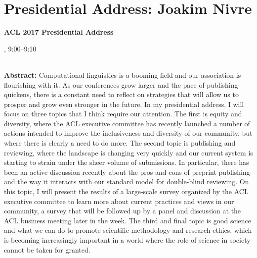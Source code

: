 \section{Presidential Address: Joakim Nivre}

\begin{center}
\begin{Large}
{\bfseries\Large ACL 2017 Presidential Address}\vspace{1em}\par
\end{Large}

\daydateyear, 9:00--9:10 \vspace{1em}\\
\PlenaryLoc \\
\vspace{1em}\par
\end{center}

\noindent
{\bfseries Abstract:} Computational linguistics is a booming field and our association is flourishing with it. As our conferences grow larger and the pace of publishing quickens, there is a constant need to reflect on strategies that will allow us to prosper and grow even stronger in the future. In my presidential address, I will focus on three topics that I think require our attention. The first is equity and diversity, where the ACL executive committee has recently launched a number of actions intended to improve the inclusiveness and diversity of our community, but where there is clearly a need to do more. The second topic is publishing and reviewing, where the landscape is changing very quickly and our current system is starting to strain under the sheer volume of submissions. In particular, there has been an active discussion recently about the pros and cons of preprint publishing and the way it interacts with our standard model for double-blind reviewing. On this topic, I will present the results of a large-scale survey organized by the ACL executive committee to learn more about current practices and views in our community, a survey that will be followed up by a panel and discussion at the ACL business meeting later in the week. The third and final topic is good science and what we can do to promote scientific methodology and research ethics, which is becoming increasingly important in a world where the role of science in society cannot be taken for granted.

\vspace{3em}\par 

